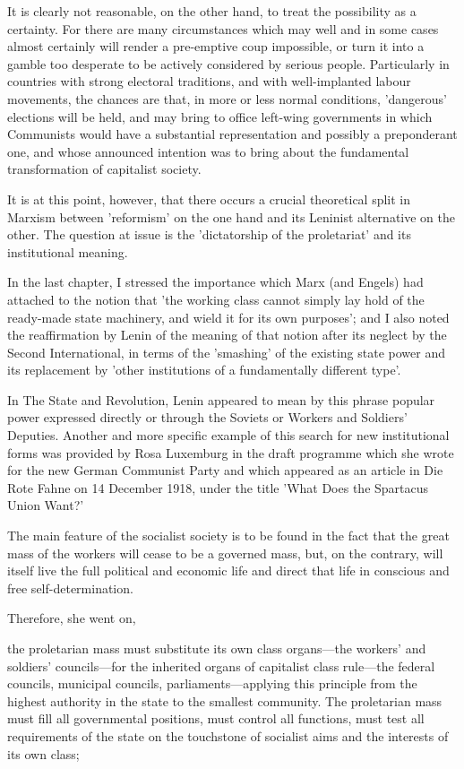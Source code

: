 It is clearly not reasonable, on the other hand, to treat the possibility as a certainty. For there are many circumstances which may well and in some cases almost certainly will render a pre-emptive coup impossible, or turn it into a gamble too desperate to be actively considered by serious people. Particularly in countries with strong electoral traditions, and with well\hyp{}implanted labour movements, the chances are that, in more or less normal conditions, 'dangerous' elections will be held, and may bring to office left-wing governments in which Communists would have a substantial representation and possibly a preponderant one, and whose announced intention was to bring about the fundamental transformation of capitalist society.

It is at this point, however, that there occurs a crucial theoretical split in Marxism between 'reformism' on the one hand and its Leninist alternative on the other. The question at issue is the 'dictatorship of the proletariat' and its institutional meaning.

In the last chapter, I stressed the importance which Marx (and Engels) had attached to the notion that 'the working class cannot simply lay hold of the ready-made state machinery, and wield it for its own purposes'; and I also noted the reaffirmation by Lenin  of the meaning of that notion after its neglect by the Second International, in terms of the 'smashing' of the existing state power and its replacement by 'other institutions of a fundamentally different type'.

In The State and Revolution, Lenin appeared to mean by this phrase popular power expressed directly or through the Soviets or Workers and Soldiers' Deputies. Another and more specific example of this search for new institutional forms was provided by Rosa Luxemburg in the draft programme which she wrote for the new German Communist Party and which appeared as an article in Die Rote Fahne on 14 December 1918, under the title 'What Does the Spartacus Union Want?'
\begin{displayquote}
    The main feature of the socialist society is to be found in the fact that the great mass of the workers will cease to be a governed mass, but, on the contrary, will itself live the full political and economic life and direct that life in conscious and free self-determination.
\end{displayquote}

Therefore, she went on,
\begin{displayquote}
    the proletarian mass must substitute its own class organs—the workers' and soldiers' councils—for the inherited organs of capitalist class rule—the federal councils, municipal councils, parliaments—applying this principle from the highest authority in the state to the smallest community. The proletarian mass must fill all governmental positions, must control all functions, must test all requirements of the state on the touchstone of socialist aims and the interests of its own class;
\end{displayquote}

